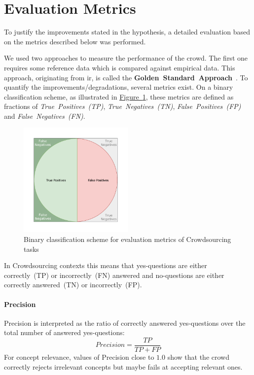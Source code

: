 
\section{Evaluation Metrics}\label{sec:evaluation_metrics}
To justify the improvements stated in the hypothesis, a detailed evaluation based on the metrics described below was performed. 

We used two approaches to measure the performance of the crowd. The first one requires some reference data which is compared against empirical data. This approach, originating from \gls{ir}, is called the \textbf{Golden~Standard~Approach}~\cite{brank2005}. To quantify the improvements/degradations, several metrics exist. On a binary classification scheme, as illustrated in \hyperref[fig:binary_classification_metrics]{Figure~\ref*{fig:binary_classification_metrics}}, these metrics are defined as fractions of \emph{True~Positives~(TP)}, \emph{True~Negatives~(TN)}, \emph{False~Positives~(FP)} and \emph{False~Negatives~(FN)}.
\begin{figure}
	 \centering
	 \includegraphics[width=0.5\textwidth]{drawio/Binary_Classification_Scheme}
	 \caption{Binary classification scheme for evaluation metrics of Crowdsourcing tasks}\label{fig:binary_classification_metrics}
\end{figure}
In Crowdsourcing contexts this means that yes-questions are either correctly~(TP) or incorrectly~(FN) answered and no-questions are either correctly answered~(TN) or incorrectly~(FP).

\paragraph{Precision} Precision is interpreted as the ratio of correctly answered yes-questions over the total number of answered yes-questions:
\[ Precision = \frac{TP}{TP + FP} \]
For concept relevance, values of Precision close to $1.0$ show that the crowd correctly rejects irrelevant concepts but maybe fails at accepting relevant ones. 
